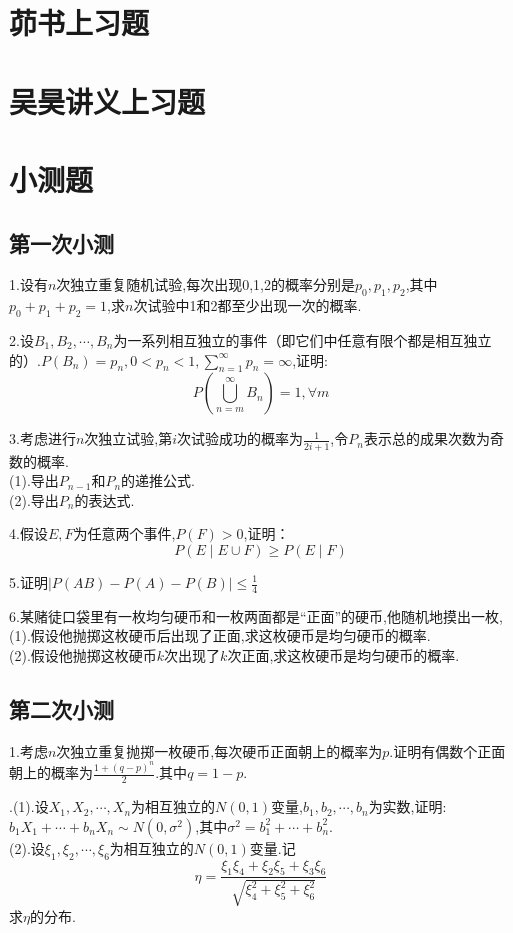 
\chapter{茆书上习题}
\chapter{吴昊讲义上习题}
\chapter{小测题}
\section{第一次小测}
\noindent 1.设有$n$次独立重复随机试验,每次出现0,1,2的概率分别是$p_0,p_1,p_2$,其中$p_0+p_1+p_2=1$,求$n$次试验中1和2都至少出现一次的概率.

\noindent 2.设$B_1,B_2,\cdots,B_n$为一系列相互独立的事件（即它们中任意有限个都是相互独立的）.$P(B_n)=p_n,0<p_n<1,\sum_{n=1}^{\infty}p_n=\infty$,证明:
$$P\left(\bigcup_{n=m}^\infty B_n\right)=1,\forall m$$

\noindent 3.考虑进行$n$次独立试验,第$i$次试验成功的概率为$\frac{1}{2i+1}$,令$P_n$表示总的成果次数为奇数的概率.\\
(1).导出$P_{n-1}$和$P_n$的递推公式.\\
(2).导出$P_n$的表达式.

\noindent 4.假设$E,F$为任意两个事件,$P(F)>0$,证明：
$$P(E\mid E\cup F)\geq P(E\mid F)$$

\noindent 5.证明$\left|P(AB)-P(A)-P(B)\right|\leq\frac{1}{4}$

\noindent 6.某赌徒口袋里有一枚均匀硬币和一枚两面都是“正面”的硬币,他随机地摸出一枚,\\
(1).假设他抛掷这枚硬币后出现了正面,求这枚硬币是均匀硬币的概率.\\
(2).假设他抛掷这枚硬币$k$次出现了$k$次正面,求这枚硬币是均匀硬币的概率.
\newpage
\section{第二次小测}
\noindent 1.考虑$n$次独立重复抛掷一枚硬币,每次硬币正面朝上的概率为$p$.证明有偶数个正面朝上的概率为$\frac{1+(q-p)^n}{2}$.其中$q=1-p$.

.(1).设$X_1,X_2,\cdots,X_n$为相互独立的$N(0,1)$变量,$b_1,b_2,\cdots,b_n$为实数,证明:$b_1X_1+\cdots+b_nX_n\sim N(0,\sigma^2)$,其中$\sigma^2=b_1^2+\cdots+b_n^2$.\\
(2).设$\xi_1,\xi_2,\cdots,\xi_6$为相互独立的$N(0,1)$变量.记
$$\eta=\frac{\xi_1\xi_4+\xi_2\xi_5+\xi_3\xi_6}{\sqrt{\xi^2_4+\xi_5^2+\xi_6^2}}$$
求$\eta$的分布.


